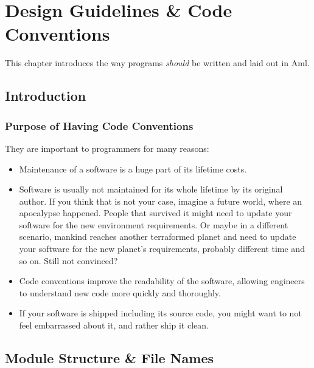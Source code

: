 
\chapter{Design Guidelines \& Code Conventions}

\minitoc

This chapter introduces the way programs {\em should} be written and laid out in Aml. 






\section{Introduction}

\subsection{Purpose of Having Code Conventions}

They are important to programmers for many reasons:
\begin{itemize}
  \item Maintenance of a software is a huge part of its lifetime costs. 
  \item Software is usually not maintained for its whole lifetime by its original author. If you think that is not your case, imagine a future world, where an apocalypse happened. People that survived it might need to update your software for the new environment requirements. Or maybe in a different scenario, mankind reaches another terraformed planet and need to update your software for the new planet’s requirements, probably different time and so on. Still not convinced? 
  \item Code conventions improve the readability of the software, allowing engineers to understand new code more quickly and thoroughly. 
  \item If your software is shipped including its source code, you might want to not feel embarrassed about it, and rather ship it clean. 
\end{itemize}






\section{Module Structure \& File Names}
\label{sec:module-structure}

